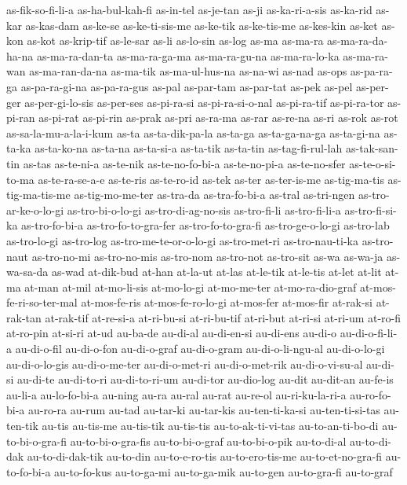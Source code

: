 {as-fik-so-fi-li-a as-ha-bul-kah-fi as-in-tel as-je-tan as-ji
as-ka-ri-a-sis as-ka-rid as-kar as-kas-dam as-ke-se as-ke-ti-sis-me
as-ke-tik as-ke-tis-me as-kes-kin as-ket as-kon as-kot as-krip-tif
as-le-sar as-li as-lo-sin as-log as-ma as-ma-ra as-ma-ra-da-ha-na
as-ma-ra-dan-ta as-ma-ra-ga-ma as-ma-ra-gu-na as-ma-ra-lo-ka as-ma-ra-wan
as-ma-ran-da-na as-ma-tik as-ma-ul-hus-na as-na-wi as-nad as-ops
as-pa-ra-ga as-pa-ra-gi-na as-pa-ra-gus as-pal as-par-tam as-par-tat
as-pek as-pel as-per-ger as-per-gi-lo-sis as-per-ses as-pi-ra-si
as-pi-ra-si-o-nal as-pi-ra-tif as-pi-ra-tor as-pi-ran as-pi-rat as-pi-rin
as-prak as-pri as-ra-ma as-rar as-re-na as-ri as-rok as-rot
as-sa-la-mu-a-la-i-kum as-ta as-ta-dik-pa-la as-ta-ga as-ta-ga-na-ga
as-ta-gi-na as-ta-ka as-ta-ko-na as-ta-na as-ta-si-a as-ta-tik as-ta-tin
as-tag-fi-rul-lah as-tak-san-tin as-tas as-te-ni-a as-te-nik
as-te-no-fo-bi-a as-te-no-pi-a as-te-no-sfer as-te-o-si-to-ma
as-te-ra-se-a-e as-te-ris as-te-ro-id as-tek as-ter as-ter-is-me
as-tig-ma-tis as-tig-ma-tis-me as-tig-mo-me-ter as-tra-da as-tra-fo-bi-a
as-tral as-tri-ngen as-tro-ar-ke-o-lo-gi as-tro-bi-o-lo-gi
as-tro-di-ag-no-sis as-tro-fi-li as-tro-fi-li-a as-tro-fi-si-ka
as-tro-fo-bi-a as-tro-fo-to-gra-fer as-tro-fo-to-gra-fi as-tro-ge-o-lo-gi
as-tro-lab as-tro-lo-gi as-tro-log as-tro-me-te-or-o-lo-gi as-tro-met-ri
as-tro-nau-ti-ka as-tro-naut as-tro-no-mi as-tro-no-mis as-tro-nom
as-tro-not as-tro-sit as-wa as-wa-ja as-wa-sa-da as-wad at-dik-bud at-han
at-la-ut at-las at-le-tik at-le-tis at-let at-lit at-ma at-man at-mil
at-mo-li-sis at-mo-lo-gi at-mo-me-ter at-mo-ra-dio-graf
at-mos-fe-ri-so-ter-mal at-mos-fe-ris at-mos-fe-ro-lo-gi at-mos-fer
at-mos-fir at-rak-si at-rak-tan at-rak-tif at-re-si-a at-ri-bu-si
at-ri-bu-tif at-ri-but at-ri-si at-ri-um at-ro-fi at-ro-pin at-si-ri at-ud
au-ba-de au-di-al au-di-en-si au-di-ens au-di-o au-di-o-fi-li-a
au-di-o-fil au-di-o-fon au-di-o-graf au-di-o-gram au-di-o-li-ngu-al
au-di-o-lo-gi au-di-o-lo-gis au-di-o-me-ter au-di-o-met-ri au-di-o-met-rik
au-di-o-vi-su-al au-di-si au-di-te au-di-to-ri au-di-to-ri-um au-di-tor
au-dio-log au-dit au-dit-an au-fe-is au-li-a au-lo-fo-bi-a au-ning au-ra
au-ral au-rat au-re-ol au-ri-ku-la-ri-a au-ro-fo-bi-a au-ro-ra au-rum
au-tad au-tar-ki au-tar-kis au-ten-ti-ka-si au-ten-ti-si-tas au-ten-tik
au-tis au-tis-me au-tis-tik au-tis-tis au-to-ak-ti-vi-tas
au-to-an-ti-bo-di au-to-bi-o-gra-fi au-to-bi-o-gra-fis au-to-bi-o-graf
au-to-bi-o-pik au-to-di-al au-to-di-dak au-to-di-dak-tik au-to-din
au-to-e-ro-tis au-to-ero-tis-me au-to-et-no-gra-fi au-to-fo-bi-a
au-to-fo-kus au-to-ga-mi au-to-ga-mik au-to-gen au-to-gra-fi au-to-graf
}
